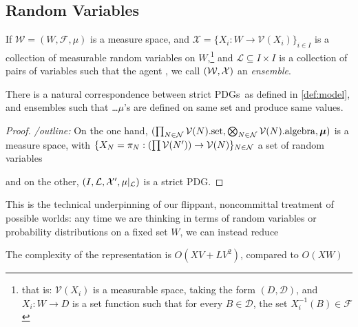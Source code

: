 \documentclass{article}
\newcommand{\MN}{PDG}%
\newcommand{\MNs}{PDGs}
\newcommand\bmu{\boldsymbol{\mu}}
\begin{document}
	\subsection{Random Variables}
	If $\mathcal W = (W, \mathcal F, \mu)$ is a measure space, and $\mathcal X = \{ X_i: W \to \mathcal V(X_i) \}_{i \in I} $ is a collection of measurable random variables on $W$,\footnote{that is: $\mathcal V(X_i)$ is a measurable space, taking the form $(D, \mathcal D)$, and $X_i : W \to D$ is a set function such that for every $B \in \mathcal D$, the set $X_i^{-1}(B) \in \mathcal F$} and 
	{\color{gray}$\mathcal L \subseteq I \times I$ is a collection of pairs of variables such that the agent } 
	, we call $(\cal W, X)$ an \emph{ensemble}.
	
	
	\begin{prop}
		There is a natural correspondence between strict \MNs\ as defined in \cref{def:model}, and ensembles such that  \ldots $\mu$'s are defined on same set and produce same values.
	\end{prop}
	\begin{proof}
		\textit{/outline:}
		On the one hand, $(\prod_{N \in \cal N} \mathcal V(N).\text{set}, \bigotimes_{N \in \cal N} \mathcal V(N).\text{algebra}, \bmu)$ is a measure space, with $\{X_N = \pi_N : \left(\prod\mathcal V(N')\right) \to  \mathcal V(N) \}_{N \in \cal N}$ a set of random variables
		
		and  on the other, $(I, \mathcal L, \mathcal X', \mu|_{\cal L})$ is a strict \MN.
	\end{proof}
	
	This is the technical underpinning of our flippant, noncommittal treatment of possible worlds: any time we are thinking in terms of random variables or probability distributions on a fixed set $W$, we can instead reduce
	
	
	The complexity of the representation is $O(XV + L V^2)$, compared to $O(XW)$
\end{document}
